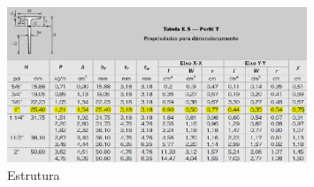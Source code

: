 \begin{figure}[h]
    \centering
    \includegraphics[width=0.8\textwidth]{figuras/perfil_t.png}
    \caption{Estrutura}
    \label{fig:awesome_image}
\end{figure}





